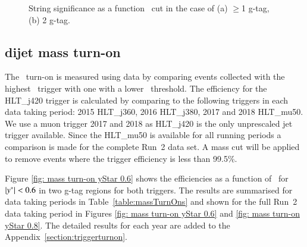 \begin{figure}[htbp]
        \centering
        \caption{String significance as a function \ystar\ cut in the case of (a) $\geq$1 g-tag, (b) 2 g-tag.}
        \label{fig: string significance as a function of y* cut}
\end{figure}

\subsection{dijet mass turn-on}
\label{section:dijetmassturn-on} %


The \mjj\ turn-on is measured using data by comparing events collected with the highest \pT\ 
trigger with one with a lower \pt\ threshold.  The efficiency for the HLT\_j420 trigger is calculated by comparing to the 
following triggers in each data taking period: 2015 HLT\_j360, 2016 HLT\_j380, 2017 and 2018 HLT\_mu50. We use a muon trigger 
2017 and 2018 as HLT\_j420 is the only unprescaled jet trigger available. Since the HLT\_mu50 is available for all running periods 
a comparison is made for the complete Run~2 data set. 
A mass cut will be applied to remove events where 
the trigger efficiency is less than 99.5\%.

Figure \ref{fig: mass turn-on yStar 0.6} shows the efficiencies as a function of \mjj\ for $|y^\ast|<0.6$ in 
two g-tag regions for both triggers.  The results 
are summarised for data taking periods in Table~\ref{table:massTurnOns} and shown for the full Run~2 data 
taking period in Figures \ref{fig: mass turn-on yStar 0.6} and \ref{fig: mass turn-on yStar 0.8}. The detailed results for
each year are added to the Appendix~\ref{section:triggerturnon}.


